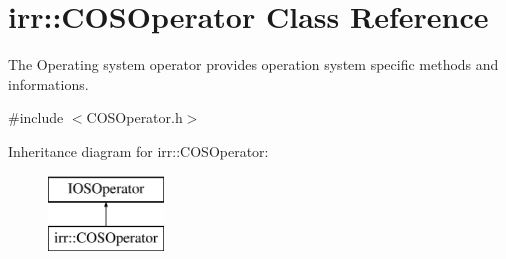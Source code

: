 \hypertarget{classirr_1_1_c_o_s_operator}{\section{irr\-:\-:C\-O\-S\-Operator Class Reference}
\label{classirr_1_1_c_o_s_operator}
}


The Operating system operator provides operation system specific methods and informations.  




{\ttfamily \#include $<$C\-O\-S\-Operator.\-h$>$}

Inheritance diagram for irr\-:\-:C\-O\-S\-Operator\-:\begin{figure}[H]
\begin{center}
\leavevmode
\includegraphics[height=2.000000cm]{classirr_1_1_c_o_s_operator}
\end{center}
\end{figure}
